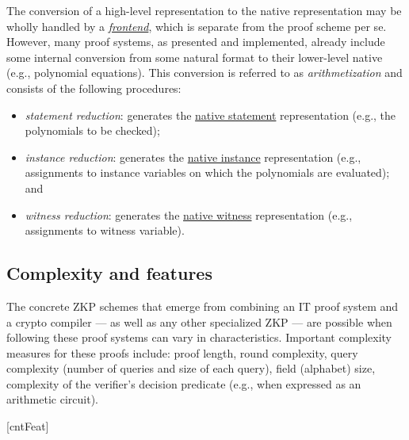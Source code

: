 The conversion of a high-level representation to the native representation may be wholly handled by a \hyperref[implem:frontends]{\emph{frontend}}, which is separate from the proof scheme per se. 
However, many proof systems, as presented and implemented, already include some internal conversion from some natural format to their lower-level native (e.g., polynomial equations).
This conversion is referred to as \emph{arithmetization} and consists of the following procedures:
\begin{itemize}[nosep]
\item \emph{statement reduction}: generates the \underline{native statement} representation (e.g., the polynomials to be checked); 
\item \emph{instance reduction}: generates the \underline{native instance} representation (e.g., assignments to instance variables on which the polynomials are evaluated); and 
\item \emph{witness reduction}: generates the \underline{native witness} representation (e.g., assignments to witness variable).
\end{itemize}


\subsection{Complexity and features}
\label{par:paradigms:taxonomy:proof-systems:features}
The concrete ZKP schemes that emerge from combining an IT proof system and a crypto compiler --- as well as any other specialized ZKP ---   are possible when following these proof systems can vary in characteristics.  
Important complexity measures for these proofs include:
proof length, 
round complexity, 
query complexity (number of queries and size of each query), 
field (alphabet) size, 
complexity of the verifier's decision predicate (e.g., when expressed as an arithmetic circuit).


\setcounter{cntFeat}{0}
\newcommand{\newfeat}{\refstepcounter{cntFeat}\arabic{cntFeat}}

[cntFeat]\setcounter{cntSubFeat}{0}
\newcommand{\newsubfeat}{\refstepcounter{cntSubFeat}\alph{cntSubFeat}}
\renewcommand{\thecntSubFeat}{\arabic{cntFeat}\alph{cntSubFeat}}




